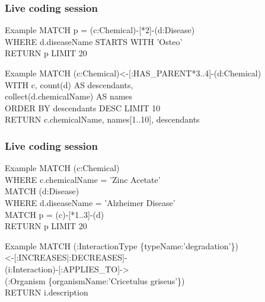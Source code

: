 \documentclass[12pt]{beamer}
\begin{document}
    \begin{frame}
        \frametitle{Live coding session}
        \begin{block}{Example}
            MATCH p = (c:Chemical)-[*2]-(d:Disease)\\
            \hspace{1cm} WHERE d.diseaseName STARTS WITH 'Osteo'\\
            \hspace{1cm} RETURN p LIMIT 20
        \end{block}
        \begin{block}{Example}
            MATCH (c:Chemical)\textless-[:HAS\_PARENT*3..4]-(d:Chemical)\\ 
            \hspace{1cm} WITH c, count(d) AS descendants,\\
            \hspace{1cm} collect(d.chemicalName) AS names\\
            \hspace{1cm} ORDER BY descendants DESC LIMIT 10\\
            RETURN c.chemicalName, names[1..10], descendants
        \end{block}
    \end{frame}
    
    \begin{frame}
        \frametitle{Live coding session}
        \begin{block}{Example}
            MATCH (c:Chemical)\\
            \hspace{1cm} WHERE c.chemicalName = 'Zinc Acetate'\\
            MATCH (d:Disease)\\
            \hspace{1cm} WHERE d.diseaseName = 'Alzheimer Disease'\\
            MATCH p = (c)-[*1..3]-(d)\\
            RETURN p LIMIT 20
        \end{block}
        \begin{block}{Example}
            MATCH (:InteractionType \{typeName:'degradation'\})\\
            \hspace{1cm} \textless-[:INCREASES\(|\):DECREASES]-\\
            \hspace{1cm} (i:Interaction)-[:APPLIES\_TO]-\textgreater\\
            \hspace{1cm} (:Organism \{organismName:'Cricetulus griseus'\})\\
            RETURN i.description
        \end{block}
    \end{frame}
\end{document}
